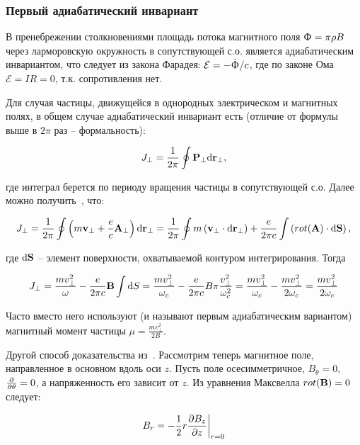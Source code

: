 \documentclass[10pt, a4paper]{article}
\begin{document}
\subsubsection{Первый адиабатический инвариант}

В пренебрежении столкновениями площадь потока магнитного поля $\Upphi=\pi\rho B$ через ларморовскую окружность в сопутствующей с.о. является адиабатическим инвариантом, что следует из закона Фарадея: $\mathcal{E}=-\dot{\Upphi}/c$, где по законе Ома $\mathcal{E}=IR=0$, т.к. сопротивления нет.

Для случая частицы, движущейся в однородных электрическом и магнитных полях, в общем случае адиабатический инвариант есть (отличие от формулы выше в $2\pi$ раз -- формальность):

\begin{equation*}
    J_\perp = \frac{1}{2\pi} \oint \vb{P}_{\perp} \dd\vb{r}_{\perp},
\end{equation*}

где интеграл берется по периоду вращения частицы в сопутствующей с.о. Далее можно получить~\cite{kotelnikov}, что:

\begin{equation*}
	J_\perp = \frac{1}{2\pi} \oint \left(m\vb{v}_\perp+\frac{e}{c}\vb{A}_\perp\right)  \dd\vb{r}_{\perp} = \frac{1}{2\pi} \oint m\left(\vb{v}_\perp \cdot \dd\vb{r}_{\perp}\right) +\frac{e}{2\pi c}\int\left(rot(\vb{A})\cdot\dd\vb{S} \right),
\end{equation*}

где $\dd\vb{S}$ -- элемент поверхности, охватываемой контуром интегрирования. Тогда

\begin{equation*}
	J_\perp = \frac{mv_\perp^2}{\omega} - \frac{e}{2\pi c}\vb{B}\int \dd S = \frac{mv_\perp^2}{\omega_c} - \frac{e}{2\pi c}B\pi\frac{v_\perp^2}{\omega_c^2} = \frac{mv_\perp^2}{\omega_c}-\frac{mv_\perp^2}{2\omega_c}=\frac{mv_\perp^2}{2\omega_c}
\end{equation*}

Часто вместо него используют (и называют первым адиабатическим вариантом) магнитный момент частицы $\mu = \frac{mv_\perp^2}{2B}$.

Другой способ доказательства из~\cite{chen}. Рассмотрим теперь магнитное поле, направленное в основном вдоль
оси $z$. Пусть поле осесимметричное, $B_\theta = 0$, $\pdv{}{\theta} = 0$, а напряженность его зависит от $z$. Из уравнения Максвелла $rot(\vb{B})=0$ следует:

\begin{equation*}
	B_r = -\frac{1}{2}r\pdv{B_z}{z}\bigg|_{r=0}
\end{equation*}
\end{document}
